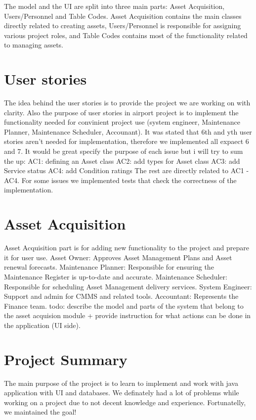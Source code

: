 \documentclass[a4paper, 12pt, final]{hitec}
\begin{document}
  The model and the UI are split into three main parts: Asset Acquisition,
  Users/Personnel and Table Codes. Asset Acquisition contains the main classes
  directly related to creating assets, Users/Personnel is responsible for
  assigning various project roles, and Table Codes contains most of the functionality
  related to managing assets.
  \clearpage

  \section{User stories}\label{sec:03}
  The idea behind the user stories is to provide the project we are working on with clarity. 
  Also the purpose of user stories in airport project is to implement the functionality needed
  for convinient project use (system engineer, Maintenance Planner, Maintenance Scheduler, Accounant).
  It was stated that 6th and yth user stories aren't needed for implementation, therefore we implemented all expaect 6 and 7.
  It would be great specify the purpose of each issue but i will try to sum the up:
  AC1: defining an Asset class 
  AC2: add types for Asset class
  AC3: add Service status
  AC4: add Condition ratings
  The rest are directly related to AC1 - AC4.
  For some issues we implemented tests that check the correctness of the implementation.
  \clearpage

  \section{Asset Acquisition}\label{sec:04}
  Asset Acquisition part is for adding new functionality to the project and 
  prepare it for user use.
  Asset Owner: Approves Asset Management Plans and Asset renewal forecasts.
  Maintenance Planner: Responsible for ensuring the Maintenance Register is up-to-date and accurate.
  Maintenance Scheduler: Responsible for scheduling Asset Management delivery services.
  System Engineer: Support and admin for CMMS and related tools.
  Accountant: Represents the Finance team.
  todo: describe the model and parts of the system that belong
  to the asset acquision module + provide instruction for what
  actions can be done in the application (UI side).
  \clearpage

  \section{Project Summary}\label{sec:07}
  The main purpose of the project is to learn to implement and work with 
  java application with UI and databases. We definately had a lot of
  problems while working on a project due to not decent knowledge and experience.
  Fortunatelly, we maintained the goal! 
  
\end{document}
